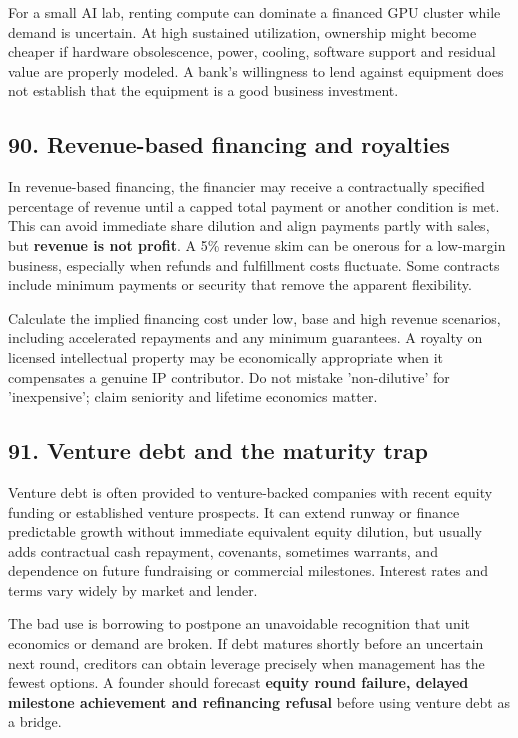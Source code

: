 For a small AI lab, renting compute can dominate a financed GPU cluster while demand is uncertain. At high sustained utilization, ownership might become cheaper if hardware obsolescence, power, cooling, software support and residual value are properly modeled. A bank's willingness to lend against equipment does not establish that the equipment is a good business investment.

\subsection{90. Revenue-based financing and royalties}


In revenue-based financing, the financier may receive a contractually specified percentage of revenue until a capped total payment or another condition is met. This can avoid immediate share dilution and align payments partly with sales, but \textbf{revenue is not profit}. A 5\% revenue skim can be onerous for a low-margin business, especially when refunds and fulfillment costs fluctuate. Some contracts include minimum payments or security that remove the apparent flexibility.

Calculate the implied financing cost under low, base and high revenue scenarios, including accelerated repayments and any minimum guarantees. A royalty on licensed intellectual property may be economically appropriate when it compensates a genuine IP contributor. Do not mistake 'non-dilutive' for 'inexpensive'; claim seniority and lifetime economics matter.

\subsection{91. Venture debt and the maturity trap}


Venture debt is often provided to venture-backed companies with recent equity funding or established venture prospects. It can extend runway or finance predictable growth without immediate equivalent equity dilution, but usually adds contractual cash repayment, covenants, sometimes warrants, and dependence on future fundraising or commercial milestones. Interest rates and terms vary widely by market and lender.

The bad use is borrowing to postpone an unavoidable recognition that unit economics or demand are broken. If debt matures shortly before an uncertain next round, creditors can obtain leverage precisely when management has the fewest options. A founder should forecast \textbf{equity round failure, delayed milestone achievement and refinancing refusal} before using venture debt as a bridge.

